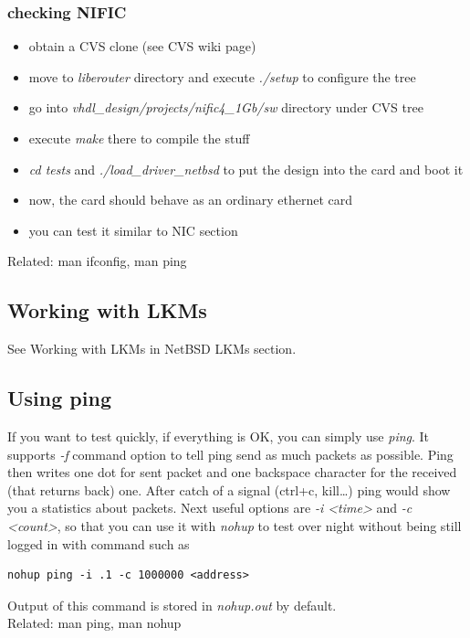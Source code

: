  \subsubsection{checking NIFIC}
  \begin{itemize}
    \item obtain a CVS clone (see CVS wiki page)
    \item move to \emph{liberouter} directory and execute \emph{./setup} to
      configure the tree
    \item go into \emph{vhdl\_design/projects/nific4\_1Gb/sw} directory under
      CVS tree
    \item execute \emph{make} there to compile the stuff
    \item \emph{cd tests} and \emph{./load\_driver\_netbsd} to put the design
      into the card and boot it
    \item now, the card should behave as an ordinary ethernet card
    \item you can test it similar to NIC section
  \end{itemize}
  Related: man ifconfig, man ping
  \subsection{Working with LKMs}
  See Working with LKMs in NetBSD LKMs section.
  \subsection{Using ping}
  If you want to test quickly, if everything is OK, you can simply use
  \emph{ping}.
  It supports \emph{-f} command option to tell ping send as much pack\-ets as
  possible. Ping then writes one dot for sent packet and one backspace
  character for the received (that returns back) one. After catch of a signal
  (ctrl+c, kill\ldots) ping would show you a statistics about packets.
  Next useful options are \emph{-i <time>} and \emph{-c <count>}, so that you
  can use it with \emph{nohup} to test over night without being still logged
  in with command such as
\begin{verbatim}
nohup ping -i .1 -c 1000000 <address>
\end{verbatim}
  Output of this command is stored in \emph{nohup.out} by default. \\[2mm]
  Related: man ping, man nohup

